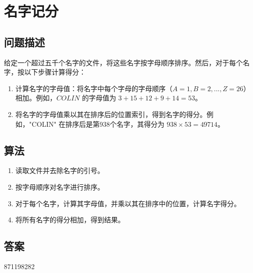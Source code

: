 \section{名字记分}\label{sec:problem22}
\subsection{问题描述}
\begin{tcolorbox}

给定一个超过五千个名字的文件，将这些名字按字母顺序排序。然后，对于每个名字，按以下步骤计算得分：

\begin{enumerate}
    \item 计算名字的字母值：将名字中每个字母的字母顺序（$A=1, B=2, ..., Z=26$）相加。例如，$COLIN$ 的字母值为 $3 + 15 + 12 + 9 + 14 = 53$。
    \item 将名字的字母值乘以其在排序后的位置索引，得到名字的得分。例如，"COLIN" 在排序后是第938个名字，其得分为 $938 \times 53 = 49714$。
\end{enumerate}
\end{tcolorbox}

\subsection{算法}
\begin{enumerate}
    \item 读取文件并去除名字的引号。
    \item 按字母顺序对名字进行排序。
    \item 对于每个名字，计算其字母值，并乘以其在排序中的位置，计算名字得分。
    \item 将所有名字的得分相加，得到结果。
\end{enumerate}

\subsection{答案}
871198282
